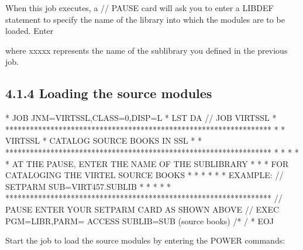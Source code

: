 \documentclass[letterpaper,10pt,english]{sphinxmanual}
\begin{document}
When this job executes, a // PAUSE card will ask you to enter a LIBDEF statement to specify the name of the library into which the modules are to be loaded. Enter

\begin{sphinxVerbatim}[commandchars=\\\{\}]
  
\end{sphinxVerbatim}

where xxxxx represents the name of the sublibrary you defined in the previous job.


\subsection{4.1.4 Loading the source modules}
\label{\detokenize{Installation_Guide:loading-the-source-modules}}
\begin{sphinxVerbatim}[commandchars=\\\{\}]
* \PYGZdl{}\PYGZdl{} JOB JNM=VIRTSSL,CLASS=0,DISP=L
* \PYGZdl{}\PYGZdl{} LST DA
// JOB VIRTSSL
* *****************************************************************
* * VIRTSSL * CATALOG SOURCE BOOKS IN SSL                         *
* *****************************************************************
* *                                                               *
* * AT THE PAUSE, ENTER THE NAME OF THE SUB\PYGZhy{}LIBRARY               *
* * FOR CATALOGING THE VIRTEL SOURCE BOOKS                        *
* *                                                               *
* * EXAMPLE: // SETPARM SUB=\PYGZsq{}VIRT457.SUBLIB\PYGZsq{}                      *
* *                                                               *
* *****************************************************************
// PAUSE ENTER YOUR SETPARM CARD AS SHOWN ABOVE
// EXEC PGM=LIBR,PARM=\PYGZsq{} ACCESS SUBLIB=\PYGZam{}SUB\PYGZsq{}
        (source books)
/*
/\PYGZam{}
* \PYGZdl{}\PYGZdl{} EOJ
\end{sphinxVerbatim}


Start the job to load the source modules by entering the POWER commands:

\begin{sphinxVerbatim}[commandchars=\\\{\}]
 
 
 
 
\end{sphinxVerbatim}
\end{document}

